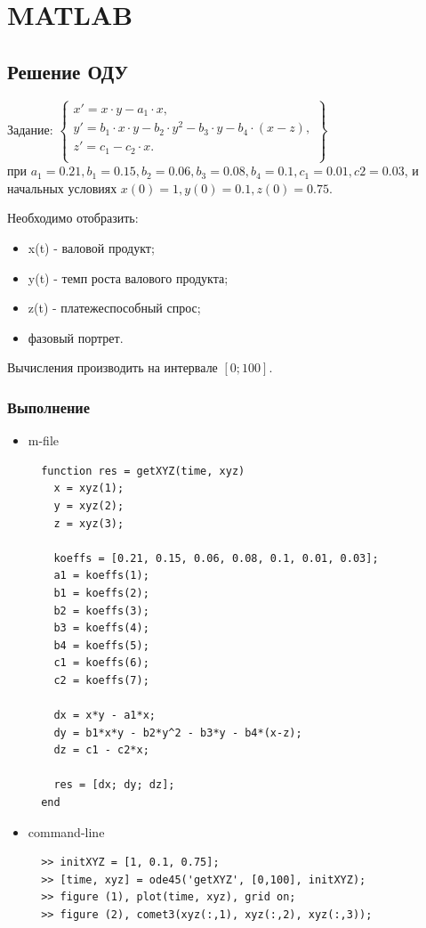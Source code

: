 \documentclass{article}
\begin{document}
\section{MATLAB}
\subsection{Решение ОДУ}
Задание:
\begin{math}
\left\{ 
\begin{array}{l}
  x' = x \cdot y - a_1 \cdot x, \\
  y' = b_1 \cdot x \cdot y - b_2  \cdot y^2 - b_3  \cdot y - b_4 \cdot (x-z),\\ 
  z' = c_1 -c_2  \cdot x.\\
\end{array}
\right\}
\end{math}\\
при $a_1 = 0.21, b_1=0.15, b_2 = 0.06, b_3 = 0.08, b_4 = 0.1, c_1 = 0.01,
c2=0.03$, и начальных условиях $x(0) = 1, y(0) = 0.1, z(0) = 0.75$.

Необходимо отобразить: 
\begin{itemize}
  \item x(t) - валовой продукт;
  \item y(t) - темп роста валового продукта;
  \item z(t) - платежеспособный спрос;
  \item фазовый портрет.
\end{itemize}

Вычисления производить на интервале $[0; 100]$.
\subsubsection{Выполнение}
\begin{itemize}
  \item m-file
  \begin{lstlisting}
  function res = getXYZ(time, xyz)
    x = xyz(1);
    y = xyz(2);
    z = xyz(3);
    
    koeffs = [0.21, 0.15, 0.06, 0.08, 0.1, 0.01, 0.03];
    a1 = koeffs(1);
    b1 = koeffs(2);
    b2 = koeffs(3);
    b3 = koeffs(4);
    b4 = koeffs(5);
    c1 = koeffs(6);
    c2 = koeffs(7);
    
    dx = x*y - a1*x;
    dy = b1*x*y - b2*y^2 - b3*y - b4*(x-z);
    dz = c1 - c2*x;

    res = [dx; dy; dz];
  end
  \end{lstlisting}
  \item command-line
  \begin{lstlisting}
  >> initXYZ = [1, 0.1, 0.75];
  >> [time, xyz] = ode45('getXYZ', [0,100], initXYZ);
  >> figure (1), plot(time, xyz), grid on;
  >> figure (2), comet3(xyz(:,1), xyz(:,2), xyz(:,3));
  \end{lstlisting}
\end{itemize}
\end{document}
